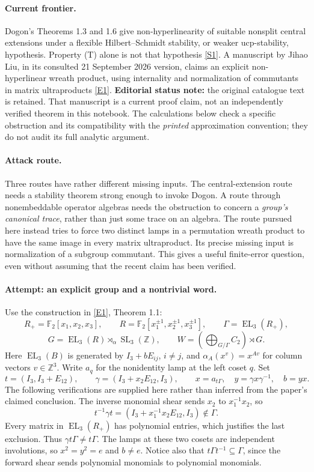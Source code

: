 \documentclass[11pt,a4paper]{article}
\newcommand{\Z}{\mathbb{Z}}
\newcommand{\F}{\mathbb{F}}
\newcommand{\sref}[2]{\hyperlink{source:#1:#2}{[S#2]}}
\newcommand{\eref}[2]{\hyperlink{extra:#1:#2}{[E#2]}}
\numberwithin{equation}{section}
\begin{document}
\paragraph{Current frontier.}
Dogon's Theorems 1.3 and 1.6 give non-hyperlinearity of suitable nonsplit
central extensions under a flexible Hilbert--Schmidt stability, or weaker
ucp-stability, hypothesis. Property (T) alone is not that hypothesis
\sref{154}{1}. A manuscript by Jihao Liu, in its consulted 21 September 2026 version, claims an
explicit non-hyperlinear wreath product, using internality and normalization
of commutants in matrix ultraproducts \eref{154}{1}. \textbf{Editorial status
note:} the original catalogue text is retained. That manuscript is a current
proof claim, not an independently verified theorem in this notebook. The
calculations below check a specific obstruction and its compatibility with
the \emph{printed} approximation convention; they do not audit its full
analytic argument.

\paragraph{Attack route.}
Three routes have rather different missing inputs. The central-extension
route needs a stability theorem strong enough to invoke Dogon. A route
through nonembeddable operator algebras needs the obstruction to concern a
\emph{group's canonical trace}, rather than just some trace on an algebra.
The route pursued here instead tries to force two distinct lamps in a
permutation wreath product to have the same image in every matrix
ultraproduct. Its precise missing input is normalization of a subgroup
commutant. This gives a useful finite-error question, even without assuming
that the recent claim has been verified.

\paragraph{Attempt: an explicit group and a nontrivial word.}
Use the construction in \eref{154}{1}, Theorem 1.1:
\[
 R_+=\F_2[x_1,x_2,x_3],\qquad
 R=\F_2[x_1^{\pm1},x_2^{\pm1},x_3^{\pm1}],\qquad
 \Gamma=\operatorname{EL}_3(R_+),
\]
\[
 G=\operatorname{EL}_3(R)\rtimes_\alpha\operatorname{SL}_3(\Z),\qquad
 W=\left(\bigoplus_{G/\Gamma}C_2\right)\rtimes G.
\]
Here $\operatorname{EL}_3(B)$ is generated by $I_3+bE_{ij}$, $i\ne j$,
and $\alpha_A(x^v)=x^{Av}$ for column vectors $v\in\Z^3$.
Write $a_q$ for the nonidentity lamp at the left coset $q$. Set
\[
 t=(I_3,I_3+E_{12}),\qquad
 \gamma=(I_3+x_2E_{12},I_3),\qquad
 x=a_{t\Gamma},\quad y=\gamma x\gamma^{-1},\quad b=yx.
\]
The following verifications are supplied here rather than inferred from the
paper's claimed conclusion. The inverse monomial shear sends $x_2$ to
$x_1^{-1}x_2$, so
\[
 t^{-1}\gamma t=(I_3+x_1^{-1}x_2E_{12},I_3)\notin\Gamma.
\]
Every matrix in $\operatorname{EL}_3(R_+)$ has polynomial entries, which
justifies the last exclusion. Thus $\gamma t\Gamma\ne t\Gamma$. The lamps
at these two cosets are independent involutions, so $x^2=y^2=e$ and
$b\ne e$. Notice also that $t\Gamma t^{-1}\subseteq\Gamma$, since the
forward shear sends polynomial monomials to polynomial monomials.
\end{document}
